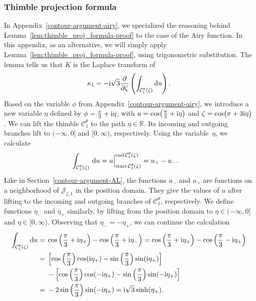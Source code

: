 \documentclass[10pt,a4paper]{amsart}
\newcommand{\R}{\mathbb{R}}
\numberwithin{equation}{section}
\begin{document}
\subsubsection{Thimble projection formula}\label{thimble-proj-airy}

In Appendix~\ref{contour-argument-airy}, we specialized the reasoning behind Lemma~\ref{lem:thimble_proj_formula-proof} to the case of the Airy function. In this appendix, as an alternative, we will simply apply Lemma~\ref{lem:thimble_proj_formula-proof}, using trigonometric substitution. The lemma tells us that $K$ is the Laplace transform of
\[ \kappa_1 = -{\rm i}\sqrt{3} \frac{\partial}{\partial \zeta}\left(\int_{\mathcal{C}_1^\theta(\zeta)}  {\rm d}u\right). \]
Based on the variable $\phi$ from Appendix~\ref{contour-argument-airy}, we introduce a new variable $\eta$ defined by ${\phi = \frac{\pi}{3} + {\rm i}\eta}$, with $u = \cos\bigl(\frac{\pi}{3} + {\rm i}\eta\bigr)$ and $\zeta = \cos\bigl(\pi + 3{\rm i}\eta\bigr)$. We can lift the thimble $\mathcal{C}^\theta_1$ to the path $\eta \in \R$. Its incoming and outgoing branches lift to $(-\infty, 0]$ and $[0, \infty)$, respectively. Using the variable~$\eta$, we calculate
\begin{align*}
\int_{\mathcal{C}_1^\theta(\zeta)} \, {\rm d}u & = u \Big|_{\operatorname{start} \mathcal{C}^\theta_1(\zeta)}^{\operatorname{end} \mathcal{C}^\theta_1(\zeta)} = u_+ - u_-.
\end{align*}
Like in Section~\ref{contour-argument-AL}, the functions $u_-$ and $u_+$ are functions on a neighborhood of $\mathcal{J}_{\zeta, 1}$ in the position domain. They give the values of $u$ after lifting to the incoming and outgoing branches of $\mathcal{C}^\theta_1$, respectively. We define functions $\eta_-$ and $\eta_+$ similarly, by lifting from the position domain to $\eta \in (-\infty, 0]$ and $\eta \in [0, \infty)$. Observing that $\eta_- = -\eta_+$, we can continue the calculation
\begin{align*}
\int_{\mathcal{C}_1^\theta(\zeta)} {\rm d}u = {}& \cos\left(\frac{\pi}{3} + {\rm i}\eta_+\right) - \cos\left(\frac{\pi}{3} + {\rm i}\eta_-\right)
 = \cos\left(\frac{\pi}{3} +{\rm i}\eta_+\right) - \cos\left(\frac{\pi}{3} - {\rm i}\eta_+\right) \\
 = {}& \left[\cos\left(\frac{\pi}{3}\right) \cos({\rm i}\eta_+) - \sin\left(\frac{\pi}{3}\right) \sin({\rm i}\eta_+)\right] \\
& - \left[\cos\left(\frac{\pi}{3}\right) \cos(-{\rm i}\eta_+) - \sin\left(\frac{\pi}{3}\right) \sin(-{\rm i}\eta_+)\right] \\
 = {}&-2 \sin\left(\frac{\pi}{3}\right) \sin(-{\rm i}\eta_+)
 = {\rm i}\sqrt{3} \sinh(\eta_+).
\end{align*}
\end{document}
